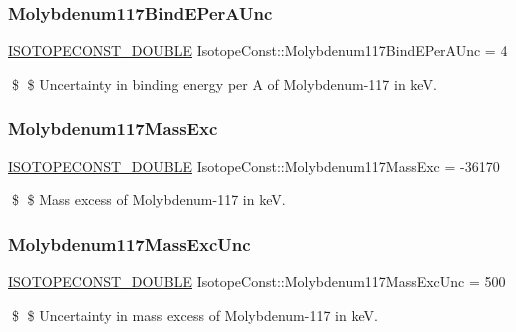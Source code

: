 \subsubsection{\texorpdfstring{Molybdenum117\+Bind\+E\+Per\+A\+Unc}{Molybdenum117BindEPerAUnc}}
{\footnotesize\ttfamily \mbox{\hyperlink{group___isotope_const-_macros_ga8f45a7272ce02c0b4c65c44636ed719a}{I\+S\+O\+T\+O\+P\+E\+C\+O\+N\+S\+T\+\_\+\+D\+O\+U\+B\+LE}} Isotope\+Const\+::\+Molybdenum117\+Bind\+E\+Per\+A\+Unc = 4}

\$ \$ Uncertainty in binding energy per A of Molybdenum-\/117 in keV. \mbox{\label{group___isotope_const-_molybdenum-_mo117_ga109fd40fb8dd78185cf8e22801f52835}} 
\subsubsection{\texorpdfstring{Molybdenum117\+Mass\+Exc}{Molybdenum117MassExc}}
{\footnotesize\ttfamily \mbox{\hyperlink{group___isotope_const-_macros_ga8f45a7272ce02c0b4c65c44636ed719a}{I\+S\+O\+T\+O\+P\+E\+C\+O\+N\+S\+T\+\_\+\+D\+O\+U\+B\+LE}} Isotope\+Const\+::\+Molybdenum117\+Mass\+Exc = -\/36170}

\$ \$ Mass excess of Molybdenum-\/117 in keV. \mbox{\label{group___isotope_const-_molybdenum-_mo117_gada700bb3705a4bbd081fa62015bf48cb}} 
\subsubsection{\texorpdfstring{Molybdenum117\+Mass\+Exc\+Unc}{Molybdenum117MassExcUnc}}
{\footnotesize\ttfamily \mbox{\hyperlink{group___isotope_const-_macros_ga8f45a7272ce02c0b4c65c44636ed719a}{I\+S\+O\+T\+O\+P\+E\+C\+O\+N\+S\+T\+\_\+\+D\+O\+U\+B\+LE}} Isotope\+Const\+::\+Molybdenum117\+Mass\+Exc\+Unc = 500}

\$ \$ Uncertainty in mass excess of Molybdenum-\/117 in keV. \mbox{\label{group___isotope_const-_molybdenum-_mo117_gacd31050476b7c8a6837675c0f8823356}} 
